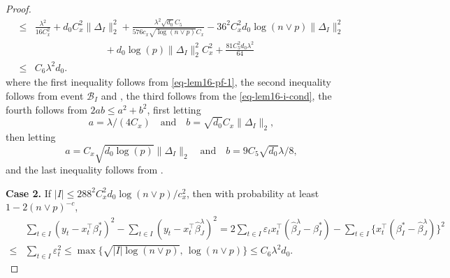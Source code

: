 \documentclass[twoside]{article}
\begin{document}
\begin{proof}
\begin{align*}
	\leq & \frac{\lambda^2}{16C_x^2} + d_0C_x^2 \|\Delta_I\|^2_2 + \frac{\lambda^2 \sqrt{d_0} C_5}{576c_x\sqrt{\log(n \vee p)}C_x} - 36^2C_x^2d_0\log(n \vee p)\|\Delta_I\|^2_2 \\
	& \hspace{3cm} + d_0\log(p)\|\Delta_I\|_2^2C_x^2 + \frac{81C_5^2d_0\lambda^2}{64} \\
	\leq & C_6\lambda^2 d_0.
	\end{align*}
	where the first inequality follows from \eqref{eq-lem16-pf-1}, the second inequality follows from event $\mathcal{B}_I$ and , the third follows from the \eqref{eq-lem16-i-cond}, the fourth follows from $2ab \leq a^2 + b^2$, first letting
	\[
		a = \lambda/(4C_x) \quad \mbox{and} \quad b = \sqrt{d_0}C_x \|\Delta_I\|_2,
	\]
	then letting
	\[
		a = C_x\sqrt{d_0 \log(p)}\|\Delta_I\|_2 \quad \mbox{and} \quad b = 9C_5\sqrt{d_0}\lambda/8,
	\]
	and the last inequality follows from . 

\vskip 3mm	
\noindent \textbf{Case 2.} If $ |I| \leq 288^2 C^2_x d_0 \log(n \vee p)/c_x^2$, then with probability at least $1 - 2(n \vee p)^{-c}$, 
	\begin{align*}
		& \sum_{t \in I} (y_t - x_t^{\top} \beta^*_I)^2 - \sum_{t \in I} (y_t - x_t^{\top} \widehat \beta^{\lambda}_J)^2 = 2 \sum_{t \in I} \varepsilon_t x_t^{\top}(\widehat{\beta}^{\lambda}_J - \beta^*_I) - \sum_{t \in I} \{x_t^{\top}(\beta^*_I  -\widehat\beta^{\lambda}_J)\}^2 \\
		\leq & \sum_{t \in I} \varepsilon_t^2 \leq \max\{\sqrt{|I|\log(n \vee p)}, \, \log(n \vee p)\} \leq C_6\lambda^2 d_0.
	\end{align*}
\end{proof} 
 
\end{document}
